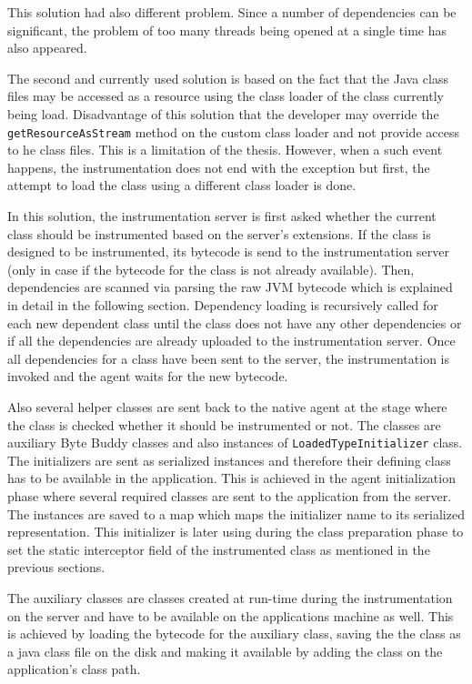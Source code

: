 This solution had also different problem. Since a number of dependencies can be significant, the problem of too many threads being opened at a single time has also appeared. 

The second and currently used solution is based on the fact that the Java class files may be accessed as a resource using the class loader of the class currently being load. Disadvantage of this solution that the developer may override the \texttt{getResourceAsStream} method on the custom class loader and not provide access to he class files. This is a limitation of the thesis. However, when a such event happens, the instrumentation does not end with the exception but first, the attempt to load the class using a different class loader is done. 

In this solution, the instrumentation server is first asked whether the current class should be instrumented based on the server's extensions. If the class is designed to be instrumented, its bytecode is send to the instrumentation server (only in case if the bytecode for the class is not already available). Then, dependencies are scanned via parsing the raw JVM bytecode which is explained in detail in the following section. Dependency loading is recursively called for each new dependent class until the class does not have any other dependencies or if all the dependencies are already uploaded to the instrumentation server. Once all dependencies for a class have been sent to the server, the instrumentation is invoked and the agent waits for the new bytecode. 

 Also several helper classes are sent back to the native agent at the stage where the class is checked whether it should be instrumented or not. The classes are auxiliary Byte Buddy classes and also instances of \texttt{LoadedTypeInitializer} class. The initializers are sent as serialized 
instances and therefore their defining class has to be available in the application. This is achieved in the agent initialization phase where several required classes are sent to the application from the server. The instances are saved to a map which maps the initializer name to its serialized representation. This initializer is later using during the class preparation phase to set the static interceptor field of the instrumented class as mentioned in the previous sections.

The auxiliary classes are classes created at run-time during the instrumentation on the server and have to be available on the applications machine as well. This is achieved by loading the bytecode for the auxiliary class, saving the the class as a java class file on the disk and making it available by adding the class on the application's class path.

